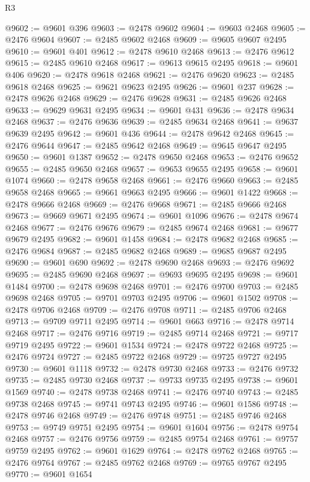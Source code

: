 \begin{lexlean}{R3}
\begin{coremodule}
@9602 := @9601 @396
@9603 := @2478 @9602
@9604 := @9603 @2468
@9605 := @2476 @9604
@9607 := @2485 @9602 @2468
@9609 := @9605 @9607 @2495
@9610 := @9601 @401
@9612 := @2478 @9610 @2468
@9613 := @2476 @9612
@9615 := @2485 @9610 @2468
@9617 := @9613 @9615 @2495
@9618 := @9601 @406
@9620 := @2478 @9618 @2468
@9621 := @2476 @9620
@9623 := @2485 @9618 @2468
@9625 := @9621 @9623 @2495
@9626 := @9601 @237
@9628 := @2478 @9626 @2468
@9629 := @2476 @9628
@9631 := @2485 @9626 @2468
@9633 := @9629 @9631 @2495
@9634 := @9601 @431
@9636 := @2478 @9634 @2468
@9637 := @2476 @9636
@9639 := @2485 @9634 @2468
@9641 := @9637 @9639 @2495
@9642 := @9601 @436
@9644 := @2478 @9642 @2468
@9645 := @2476 @9644
@9647 := @2485 @9642 @2468
@9649 := @9645 @9647 @2495
@9650 := @9601 @1387
@9652 := @2478 @9650 @2468
@9653 := @2476 @9652
@9655 := @2485 @9650 @2468
@9657 := @9653 @9655 @2495
@9658 := @9601 @1074
@9660 := @2478 @9658 @2468
@9661 := @2476 @9660
@9663 := @2485 @9658 @2468
@9665 := @9661 @9663 @2495
@9666 := @9601 @1422
@9668 := @2478 @9666 @2468
@9669 := @2476 @9668
@9671 := @2485 @9666 @2468
@9673 := @9669 @9671 @2495
@9674 := @9601 @1096
@9676 := @2478 @9674 @2468
@9677 := @2476 @9676
@9679 := @2485 @9674 @2468
@9681 := @9677 @9679 @2495
@9682 := @9601 @1458
@9684 := @2478 @9682 @2468
@9685 := @2476 @9684
@9687 := @2485 @9682 @2468
@9689 := @9685 @9687 @2495
@9690 := @9601 @690
@9692 := @2478 @9690 @2468
@9693 := @2476 @9692
@9695 := @2485 @9690 @2468
@9697 := @9693 @9695 @2495
@9698 := @9601 @1484
@9700 := @2478 @9698 @2468
@9701 := @2476 @9700
@9703 := @2485 @9698 @2468
@9705 := @9701 @9703 @2495
@9706 := @9601 @1502
@9708 := @2478 @9706 @2468
@9709 := @2476 @9708
@9711 := @2485 @9706 @2468
@9713 := @9709 @9711 @2495
@9714 := @9601 @663
@9716 := @2478 @9714 @2468
@9717 := @2476 @9716
@9719 := @2485 @9714 @2468
@9721 := @9717 @9719 @2495
@9722 := @9601 @1534
@9724 := @2478 @9722 @2468
@9725 := @2476 @9724
@9727 := @2485 @9722 @2468
@9729 := @9725 @9727 @2495
@9730 := @9601 @1118
@9732 := @2478 @9730 @2468
@9733 := @2476 @9732
@9735 := @2485 @9730 @2468
@9737 := @9733 @9735 @2495
@9738 := @9601 @1569
@9740 := @2478 @9738 @2468
@9741 := @2476 @9740
@9743 := @2485 @9738 @2468
@9745 := @9741 @9743 @2495
@9746 := @9601 @1586
@9748 := @2478 @9746 @2468
@9749 := @2476 @9748
@9751 := @2485 @9746 @2468
@9753 := @9749 @9751 @2495
@9754 := @9601 @1604
@9756 := @2478 @9754 @2468
@9757 := @2476 @9756
@9759 := @2485 @9754 @2468
@9761 := @9757 @9759 @2495
@9762 := @9601 @1629
@9764 := @2478 @9762 @2468
@9765 := @2476 @9764
@9767 := @2485 @9762 @2468
@9769 := @9765 @9767 @2495
@9770 := @9601 @1654

\end{coremodule}
\end{lexlean}
